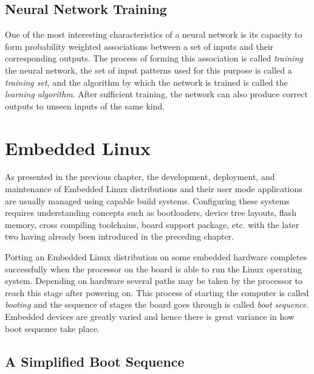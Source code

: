 \subsection{Neural Network Training}

One of the most interesting characteristics of a neural network is its capacity to form probability weighted associations between a set of inputs and their corresponding outputs. The process of forming this association is called \textit{training} the neural network, the set of input patterns used for this purpose is called a \textit{training set}, and the algorithm by which the network is trained is called the \textit{learning algorithm}. After sufficient training, the network can also produce correct outputs to unseen inputs of the same kind.


\section{Embedded Linux}

As presented in the previous chapter, the development, deployment, and maintenance of Embedded Linux distributions and their user mode applications are usually managed using capable build systems. Configuring these systems requires understanding concepts such as bootloaders, device tree layouts, flash memory, cross compiling toolchains, board support package, etc. with the later two having already been introduced in the preceding chapter.

Porting an Embedded Linux distribution on some embedded hardware completes successfully when the processor on the board is able to run the Linux operating system. Depending on hardware several paths may be taken by the processor to reach this stage after powering on. This process of starting the computer is called \textit{booting} and the sequence of stages the board goes through is called \textit{boot sequence}. Embedded devices are greatly varied and hence there is great variance in how boot sequence take place.

\subsection{A Simplified Boot Sequence}

